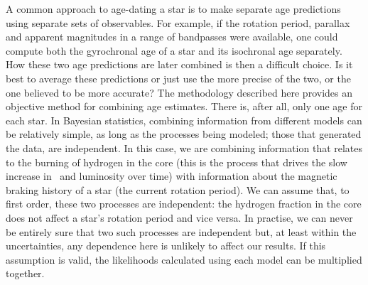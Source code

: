 




A common approach to age-dating a star is to make separate age predictions
using separate sets of observables.
For example, if the rotation period, parallax and apparent magnitudes in a
range of bandpasses were available, one could compute both the gyrochronal age
of a star and its isochronal age separately.
How these two age predictions are later combined is then a difficult choice.
Is it best to average these predictions or just use the more precise of the
two, or the one believed to be more accurate?
The methodology described here provides an objective method for combining age
estimates.
There is, after all, only one age for each star.
In Bayesian statistics, combining information from different models can be
relatively simple, as long as the processes being modeled; those that
generated the data, are independent.
In this case, we are combining information that relates to the burning of
hydrogen in the core (this is the process that drives the slow increase in
\teff\ and luminosity over time) with information about the magnetic braking
history of a star (the current rotation period).
We can assume that, to first order, these two processes are independent: the
hydrogen fraction in the core does not affect a star's rotation period and
vice versa.
In practise,  we can never be entirely sure that two such processes are
independent but, at least within the uncertainties, any dependence here is
unlikely to affect our results.
If this assumption is valid, the likelihoods calculated using each model can
be multiplied together.

